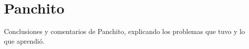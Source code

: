 \section{Panchito}
Conclusiones y comentarios de Panchito, explicando los problemas que tuvo y lo que aprendió.
